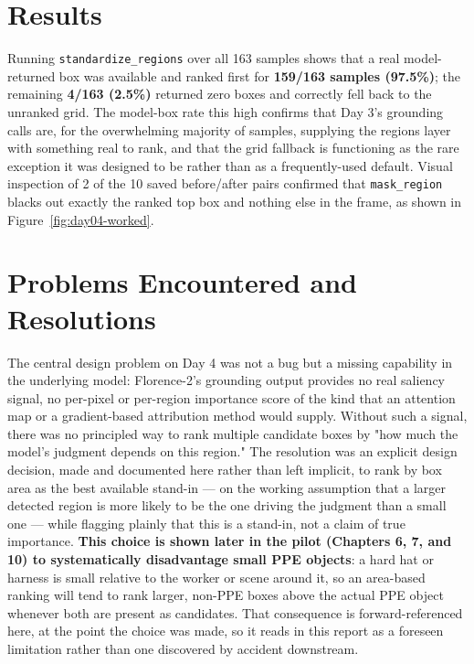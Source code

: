 \section{Results}

Running \texttt{standardize\_regions} over all 163 samples shows that a real model-returned box was
available and ranked first for \textbf{159/163 samples (97.5\%)}; the remaining \textbf{4/163
(2.5\%)} returned zero boxes and correctly fell back to the unranked grid. The model-box rate this
high confirms that Day 3's grounding calls are, for the overwhelming majority of samples, supplying
the regions layer with something real to rank, and that the grid fallback is functioning as the
rare exception it was designed to be rather than as a frequently-used default. Visual inspection of
2 of the 10 saved before/after pairs confirmed that \texttt{mask\_region} blacks out exactly the
ranked top box and nothing else in the frame, as shown in Figure~\ref{fig:day04-worked}.

\section{Problems Encountered and Resolutions}

The central design problem on Day 4 was not a bug but a missing capability in the underlying model:
Florence-2's grounding output provides no real saliency signal, no per-pixel or per-region
importance score of the kind that an attention map or a gradient-based attribution method would
supply. Without such a signal, there was no principled way to rank multiple candidate boxes by
"how much the model's judgment depends on this region." The resolution was an explicit design
decision, made and documented here rather than left implicit, to rank by box area as the best
available stand-in --- on the working assumption that a larger detected region is more likely to be
the one driving the judgment than a small one --- while flagging plainly that this is a stand-in,
not a claim of true importance. \textbf{This choice is shown later in the pilot (Chapters 6, 7, and
10) to systematically disadvantage small PPE objects}: a hard hat or harness is small relative to
the worker or scene around it, so an area-based ranking will tend to rank larger, non-PPE boxes
above the actual PPE object whenever both are present as candidates. That consequence is
forward-referenced here, at the point the choice was made, so it reads in this report as a foreseen
limitation rather than one discovered by accident downstream.

